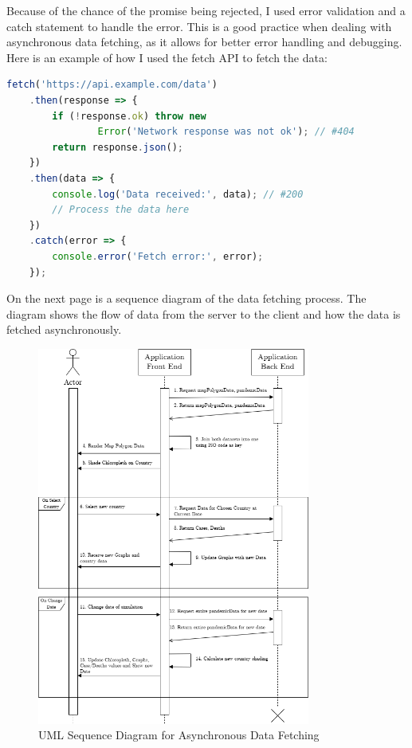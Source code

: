 \documentclass{report}
\begin{document}
Because of the chance of the promise being rejected, I used error validation and a catch statement to handle the error. This is a good practice when dealing with asynchronous data fetching, as it allows for better error handling and debugging. Here is an example of how I used the fetch API to fetch the data:
\begin{center}
    \begin{lstlisting}[language=JavaScript]
    fetch('https://api.example.com/data')
    .then(response => {
        if (!response.ok) throw new
                Error('Network response was not ok'); // #404
        return response.json();
    })
    .then(data => {
        console.log('Data received:', data); // #200
        // Process the data here
    })
    .catch(error => {
        console.error('Fetch error:', error);
    });
    \end{lstlisting}
\end{center}

On the next page is a sequence diagram of the data fetching process. The diagram shows the flow of data from the server to the client and how the data is fetched asynchronously.\\

\newpage
\begin{center}
    \begin{figure}[h]
        \centering
        \includegraphics[width=0.8\textwidth]{Images/sequence_diagram.drawio.png}
        \caption{UML Sequence Diagram for Asynchronous Data Fetching}
        \label{fig:sequence_diagram}
    \end{figure}
\end{center}
\newpage
\end{document}

